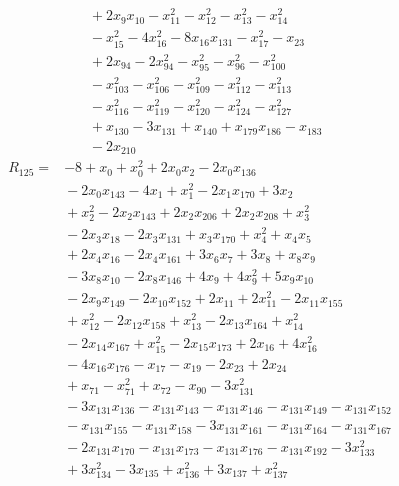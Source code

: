 {\begin{align*}
&{}  + 2x_{9} x_{10} - x_{11}^{2} - x_{12}^{2} - x_{13}^{2} - x_{14}^{2} \\
&{}  - x_{15}^{2} - 4x_{16}^{2} - 8x_{16} x_{131} - x_{17}^{2} - x_{23} \\
&{}  + 2x_{94} - 2x_{94}^{2} - x_{95}^{2} - x_{96}^{2} - x_{100}^{2} \\
&{}  - x_{103}^{2} - x_{106}^{2} - x_{109}^{2} - x_{112}^{2} - x_{113}^{2} \\
&{}  - x_{116}^{2} - x_{119}^{2} - x_{120}^{2} - x_{124}^{2} - x_{127}^{2} \\
&{}  + x_{130} - 3x_{131} + x_{140} + x_{179} x_{186} - x_{183} \\
&{}  - 2x_{210}
\end{align*}
\begin{align*}
R_{125} ={}& -8 + x_{0} + x_{0}^{2} + 2x_{0} x_{2} - 2x_{0} x_{136} \\
&{}  - 2x_{0} x_{143} - 4x_{1} + x_{1}^{2} - 2x_{1} x_{170} + 3x_{2} \\
&{}  + x_{2}^{2} - 2x_{2} x_{143} + 2x_{2} x_{206} + 2x_{2} x_{208} + x_{3}^{2} \\
&{}  - 2x_{3} x_{18} - 2x_{3} x_{131} + x_{3} x_{170} + x_{4}^{2} + x_{4} x_{5} \\
&{}  + 2x_{4} x_{16} - 2x_{4} x_{161} + 3x_{6} x_{7} + 3x_{8} + x_{8} x_{9} \\
&{}  - 3x_{8} x_{10} - 2x_{8} x_{146} + 4x_{9} + 4x_{9}^{2} + 5x_{9} x_{10} \\
&{}  - 2x_{9} x_{149} - 2x_{10} x_{152} + 2x_{11} + 2x_{11}^{2} - 2x_{11} x_{155} \\
&{}  + x_{12}^{2} - 2x_{12} x_{158} + x_{13}^{2} - 2x_{13} x_{164} + x_{14}^{2} \\
&{}  - 2x_{14} x_{167} + x_{15}^{2} - 2x_{15} x_{173} + 2x_{16} + 4x_{16}^{2} \\
&{}  - 4x_{16} x_{176} - x_{17} - x_{19} - 2x_{23} + 2x_{24} \\
&{}  + x_{71} - x_{71}^{2} + x_{72} - x_{90} - 3x_{131}^{2} \\
&{}  - 3x_{131} x_{136} - x_{131} x_{143} - x_{131} x_{146} - x_{131} x_{149} - x_{131} x_{152} \\
&{}  - x_{131} x_{155} - x_{131} x_{158} - 3x_{131} x_{161} - x_{131} x_{164} - x_{131} x_{167} \\
&{}  - 2x_{131} x_{170} - x_{131} x_{173} - x_{131} x_{176} - x_{131} x_{192} - 3x_{133}^{2} \\
&{}  + 3x_{134}^{2} - 3x_{135} + x_{136}^{2} + 3x_{137} + x_{137}^{2} \\

\end{align*}}
